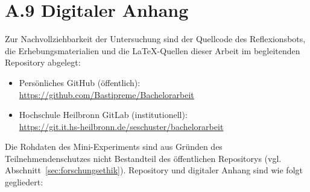 \section*{A.9 Digitaler Anhang}
\label{app:digitaleranhang}

Zur Nachvollziehbarkeit der Untersuchung sind der Quellcode des Reflexionsbots, die
Erhebungsmaterialien und die \LaTeX-Quellen dieser Arbeit im begleitenden Repository abgelegt:

\begin{itemize}
    \item Persönliches GitHub (öffentlich):\\
    \url{https://github.com/Bastipreme/Bachelorarbeit}

    \item Hochschule Heilbronn GitLab (institutionell):\\
    \url{https://git.it.hs-heilbronn.de/seschuster/bachelorarbeit}
\end{itemize}

Die Rohdaten des Mini-Experiments sind aus Gründen des Teilnehmendenschutzes nicht Bestandteil des
öffentlichen Repositorys (vgl. Abschnitt~\ref{sec:forschungsethik}). Repository und digitaler Anhang
sind wie folgt gegliedert:

